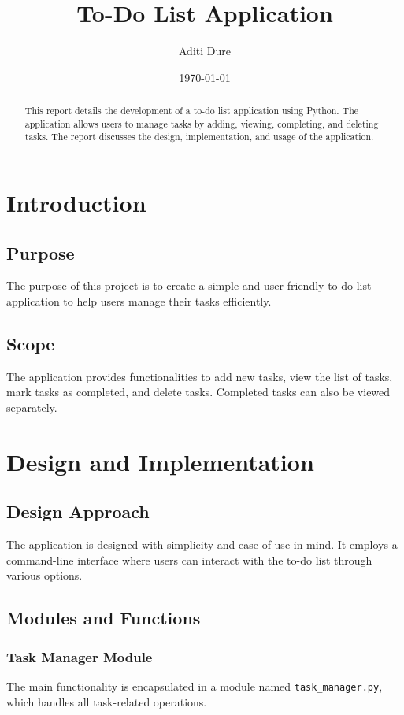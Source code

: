 \documentclass[12pt,a4paper]{report}
\title{To-Do List Application}
\author{Aditi Dure}
\date{\today}
\begin{document}
\maketitle

\begin{abstract}
This report details the development of a to-do list application using Python. The application allows users to manage tasks by adding, viewing, completing, and deleting tasks. The report discusses the design, implementation, and usage of the application.
\end{abstract}

\tableofcontents

\chapter{Introduction}
\section{Purpose}
The purpose of this project is to create a simple and user-friendly to-do list application to help users manage their tasks efficiently.

\section{Scope}
The application provides functionalities to add new tasks, view the list of tasks, mark tasks as completed, and delete tasks. Completed tasks can also be viewed separately.

\chapter{Design and Implementation}
\section{Design Approach}
The application is designed with simplicity and ease of use in mind. It employs a command-line interface where users can interact with the to-do list through various options.

\section{Modules and Functions}
\subsection{Task Manager Module}
The main functionality is encapsulated in a module named \texttt{task\_manager.py}, which handles all task-related operations.
\end{document}
